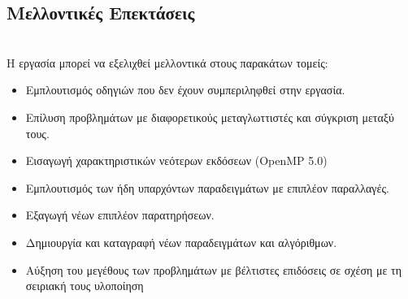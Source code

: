 \subsection{Μελλοντικές Επεκτάσεις}
\ \\
Η εργασία μπορεί να εξελιχθεί μελλοντικά στους παρακάτων τομείς:
\begin{itemize}
\item{Εμπλουτισμός οδηγιών που δεν έχουν συμπεριληφθεί στην εργασία.}
\item{Επίλυση προβλημάτων με διαφορετικούς μεταγλωττιστές και σύγκριση μεταξύ τους.}
\item{Εισαγωγή χαρακτηριστικών νεότερων εκδόσεων (OpenMP 5.0)}
\item{Εμπλουτισμός των ήδη υπαρχόντων παραδειγμάτων με επιπλέον παραλλαγές.}
\item{Εξαγωγή νέων επιπλέον παρατηρήσεων.}
\item{Δημιουργία και καταγραφή νέων παραδειγμάτων και αλγόριθμων.}
\item{Αύξηση του μεγέθους των προβλημάτων με βέλτιστες επιδόσεις σε σχέση με τη σειριακή τους υλοποίηση}
\end{itemize}
